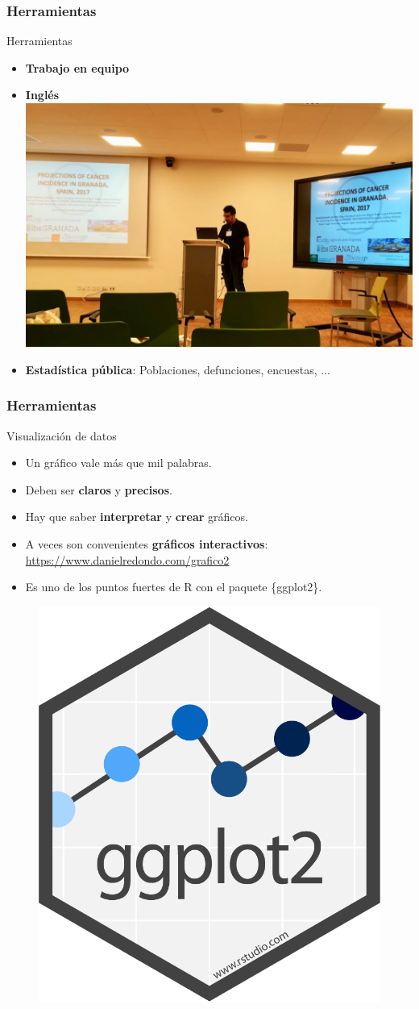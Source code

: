 \documentclass{beamer}
\begin{document}

\begin{frame}\frametitle{Herramientas}
	\begin{block}{Herramientas}
		\begin{itemize}			
			\item \textbf{Trabajo en equipo}
			\item \textbf{Inglés}\\
				\includegraphics[width=.6\textwidth]{images/cop.jpeg}
			\item \textbf{Estadística pública}: Poblaciones, defunciones, encuestas, ...
		\end{itemize}
	\end{block}
\end{frame}


\begin{frame}\frametitle{Herramientas}
	\begin{block}{Visualización de datos}
		\begin{itemize}
			\item Un gráfico vale más que mil palabras.
			\item Deben ser \textbf{claros} y \textbf{precisos}.
			\item Hay que saber \textbf{interpretar} y \textbf{crear} gráficos.
			\item A veces son convenientes \textbf{gráficos interactivos}: \url{https://www.danielredondo.com/grafico2}
			\item Es uno de los puntos fuertes de R con el paquete  \{ggplot2\}.
		\end{itemize}
		\begin{figure}
			\centering
			\includegraphics[width=.20\textwidth]{images/ggplot2.png}
		\end{figure}
	\end{block}
\end{frame}
\end{document}
